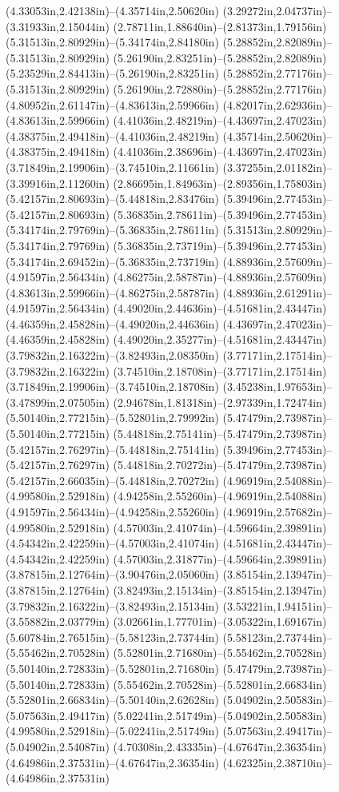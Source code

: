 (4.33053in,2.42138in)--(4.35714in,2.50620in) (3.29272in,2.04737in)--(3.31933in,2.15044in) (2.78711in,1.88640in)--(2.81373in,1.79156in) (5.31513in,2.80929in)--(5.34174in,2.84180in) (5.28852in,2.82089in)--(5.31513in,2.80929in) (5.26190in,2.83251in)--(5.28852in,2.82089in) (5.23529in,2.84413in)--(5.26190in,2.83251in) (5.28852in,2.77176in)--(5.31513in,2.80929in) (5.26190in,2.72880in)--(5.28852in,2.77176in) (4.80952in,2.61147in)--(4.83613in,2.59966in) (4.82017in,2.62936in)--(4.83613in,2.59966in) (4.41036in,2.48219in)--(4.43697in,2.47023in) (4.38375in,2.49418in)--(4.41036in,2.48219in) (4.35714in,2.50620in)--(4.38375in,2.49418in) (4.41036in,2.38696in)--(4.43697in,2.47023in) (3.71849in,2.19906in)--(3.74510in,2.11661in) (3.37255in,2.01182in)--(3.39916in,2.11260in) (2.86695in,1.84963in)--(2.89356in,1.75803in) (5.42157in,2.80693in)--(5.44818in,2.83476in) (5.39496in,2.77453in)--(5.42157in,2.80693in) (5.36835in,2.78611in)--(5.39496in,2.77453in) (5.34174in,2.79769in)--(5.36835in,2.78611in) (5.31513in,2.80929in)--(5.34174in,2.79769in) (5.36835in,2.73719in)--(5.39496in,2.77453in) (5.34174in,2.69452in)--(5.36835in,2.73719in) (4.88936in,2.57609in)--(4.91597in,2.56434in) (4.86275in,2.58787in)--(4.88936in,2.57609in) (4.83613in,2.59966in)--(4.86275in,2.58787in) (4.88936in,2.61291in)--(4.91597in,2.56434in) (4.49020in,2.44636in)--(4.51681in,2.43447in) (4.46359in,2.45828in)--(4.49020in,2.44636in) (4.43697in,2.47023in)--(4.46359in,2.45828in) (4.49020in,2.35277in)--(4.51681in,2.43447in) (3.79832in,2.16322in)--(3.82493in,2.08350in) (3.77171in,2.17514in)--(3.79832in,2.16322in) (3.74510in,2.18708in)--(3.77171in,2.17514in) (3.71849in,2.19906in)--(3.74510in,2.18708in) (3.45238in,1.97653in)--(3.47899in,2.07505in) (2.94678in,1.81318in)--(2.97339in,1.72474in) (5.50140in,2.77215in)--(5.52801in,2.79992in) (5.47479in,2.73987in)--(5.50140in,2.77215in) (5.44818in,2.75141in)--(5.47479in,2.73987in) (5.42157in,2.76297in)--(5.44818in,2.75141in) (5.39496in,2.77453in)--(5.42157in,2.76297in) (5.44818in,2.70272in)--(5.47479in,2.73987in) (5.42157in,2.66035in)--(5.44818in,2.70272in) (4.96919in,2.54088in)--(4.99580in,2.52918in) (4.94258in,2.55260in)--(4.96919in,2.54088in) (4.91597in,2.56434in)--(4.94258in,2.55260in) (4.96919in,2.57682in)--(4.99580in,2.52918in) (4.57003in,2.41074in)--(4.59664in,2.39891in) (4.54342in,2.42259in)--(4.57003in,2.41074in) (4.51681in,2.43447in)--(4.54342in,2.42259in) (4.57003in,2.31877in)--(4.59664in,2.39891in) (3.87815in,2.12764in)--(3.90476in,2.05060in) (3.85154in,2.13947in)--(3.87815in,2.12764in) (3.82493in,2.15134in)--(3.85154in,2.13947in) (3.79832in,2.16322in)--(3.82493in,2.15134in) (3.53221in,1.94151in)--(3.55882in,2.03779in) (3.02661in,1.77701in)--(3.05322in,1.69167in) (5.60784in,2.76515in)--(5.58123in,2.73744in) (5.58123in,2.73744in)--(5.55462in,2.70528in) (5.52801in,2.71680in)--(5.55462in,2.70528in) (5.50140in,2.72833in)--(5.52801in,2.71680in) (5.47479in,2.73987in)--(5.50140in,2.72833in) (5.55462in,2.70528in)--(5.52801in,2.66834in) (5.52801in,2.66834in)--(5.50140in,2.62628in) (5.04902in,2.50583in)--(5.07563in,2.49417in) (5.02241in,2.51749in)--(5.04902in,2.50583in) (4.99580in,2.52918in)--(5.02241in,2.51749in) (5.07563in,2.49417in)--(5.04902in,2.54087in) (4.70308in,2.43335in)--(4.67647in,2.36354in) (4.64986in,2.37531in)--(4.67647in,2.36354in) (4.62325in,2.38710in)--(4.64986in,2.37531in) 